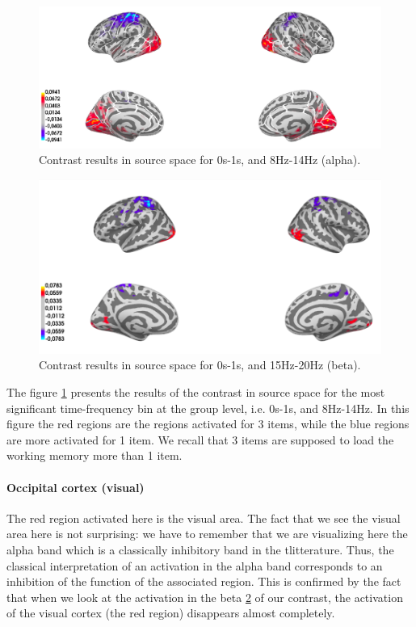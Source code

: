 \begin{figure}[ht]
    \centering
    \includegraphics[width=15cm]{images_report/source/source_results_3d_cropped.png}
    \caption[Contrast results in the source space (alpha)]%
    {Contrast results in source space for 0s-1s, and 8Hz-14Hz (alpha).}
    \label{results_source_space_alpha}
\end{figure}

\begin{figure}[ht]
    \centering
    \includegraphics[width=13cm]{images_report/source/source_results_beta_1s.png}
    \caption[Results of the contrast in the source space.]%
    {Contrast results in source space for 0s-1s, and 15Hz-20Hz (beta).}
    \label{results_source_space_beta}
\end{figure}
 
The figure \ref{results_source_space_alpha} presents the results of the contrast in source space for the most significant time-frequency bin at the group level, i.e. 0s-1s, and 8Hz-14Hz. In this figure the red regions are the regions activated for 3 items, while the blue regions are more activated for 1 item. We recall that 3 items are supposed to load the working memory more than 1 item.

\paragraph{Occipital cortex (visual)}
\label{section:alpha_discussion}
The red region activated here is the visual area. The fact that we see the visual area here is not surprising: we have to remember that we are visualizing here the alpha band which is a classically inhibitory band in the tlitterature. Thus, the classical interpretation of an activation in the alpha band corresponds to an inhibition of the function of the associated region. This is confirmed by the fact that when we look at the activation in the beta \ref{results_source_space_beta} of our contrast, the activation of the visual cortex (the red region) disappears almost completely.

